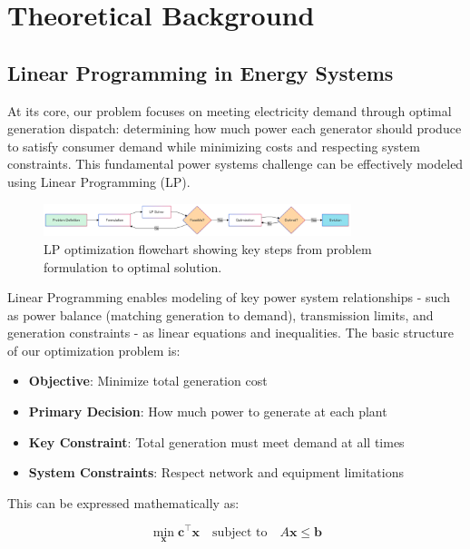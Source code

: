 \newpage
\section{Theoretical Background}
\label{sec:theoretical_background}

\subsection{Linear Programming in Energy Systems}

At its core, our problem focuses on meeting electricity demand through optimal generation dispatch:
determining how much power each generator should produce to satisfy consumer demand while minimizing costs 
and respecting system constraints. This fundamental power systems challenge can be effectively modeled using 
Linear Programming (LP).
\begin{figure}[h]
    \centering
    \includegraphics[width=0.8\textwidth]{images/lp_flowchart.png}
    \caption{LP optimization flowchart showing key steps from problem formulation to optimal solution.} \label{fig:lp_flowchart}
\end{figure}

Linear Programming enables modeling of key power system relationships - such as power balance 
(matching generation to demand), transmission limits, and generation constraints - as linear 
equations and inequalities. The basic structure of our optimization problem is:

\begin{itemize}
    \item \textbf{Objective}: Minimize total generation cost
    \item \textbf{Primary Decision}: How much power to generate at each plant
    \item \textbf{Key Constraint}: Total generation must meet demand at all times
    \item \textbf{System Constraints}: Respect network and equipment limitations
\end{itemize}

This can be expressed mathematically as:

\begin{equation}
    \min_{\mathbf{x}} \mathbf{c}^\top \mathbf{x} \quad \text{subject to} \quad A\mathbf{x} \leq \mathbf{b}
\end{equation}

